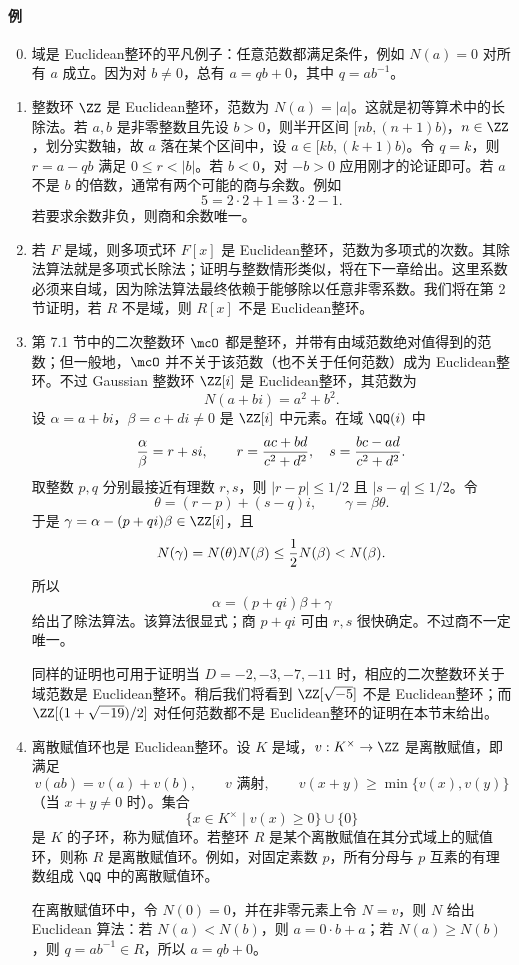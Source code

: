 \paragraph{例}
\begin{enumerate}[label=(\arabic*)]
	\setcounter{enumi}{-1}
	\item 域是 Euclidean整环的平凡例子：任意范数都满足条件，例如 $N(a)=0$ 对所有 $a$ 成立。因为对 $b\neq0$，总有 $a=qb+0$，其中 $q=ab^{-1}$。
	
	\item 整数环 $\ZZ$ 是 Euclidean整环，范数为 $N(a)=|a|$。这就是初等算术中的长除法。若 $a,b$ 是非零整数且先设 $b>0$，则半开区间 $[nb,(n+1)b)$，$n\in\ZZ$，划分实数轴，故 $a$ 落在某个区间中，设 $a\in[kb,(k+1)b)$。令 $q=k$，则 $r=a-qb$ 满足 $0\leq r<|b|$。若 $b<0$，对 $-b>0$ 应用刚才的论证即可。若 $a$ 不是 $b$ 的倍数，通常有两个可能的商与余数。例如
	\[
	5=2\cdot2+1=3\cdot2-1.
	\]
	若要求余数非负，则商和余数唯一。
	
	\item 若 $F$ 是域，则多项式环 $F[x]$ 是 Euclidean整环，范数为多项式的次数。其除法算法就是多项式长除法；证明与整数情形类似，将在下一章给出。这里系数必须来自域，因为除法算法最终依赖于能够除以任意非零系数。我们将在第 2 节证明，若 $R$ 不是域，则 $R[x]$ 不是 Euclidean整环。
	
	\item 第 7.1 节中的二次整数环 $\mcO$ 都是整环，并带有由域范数绝对值得到的范数；但一般地，$\mcO$ 并不关于该范数（也不关于任何范数）成为 Euclidean整环。不过 Gaussian 整数环 $\ZZ[i]$ 是 Euclidean整环，其范数为
	\[
	N(a+bi)=a^2+b^2.
	\]
	设 $\alpha=a+bi$，$\beta=c+di\neq0$ 是 $\ZZ[i]$ 中元素。在域 $\QQ(i)$ 中
	\[
	{\alpha\over\beta}=r+si,
	\qquad
	r={ac+bd\over c^2+d^2},\quad s={bc-ad\over c^2+d^2}.
	\]
	取整数 $p,q$ 分别最接近有理数 $r,s$，则 $|r-p|\leq1/2$ 且 $|s-q|\leq1/2$。令
	\[
	\theta=(r-p)+(s-q)i,
	\qquad \gamma=\beta\theta.
	\]
	于是 $\gamma=\alpha-(p+qi)\beta\in\ZZ[i]$，且
	\[
	N(\gamma)=N(\theta)N(\beta)\leq {1\over2}N(\beta)<N(\beta).
	\]
	所以
	\[
	\alpha=(p+qi)\beta+\gamma
	\]
	给出了除法算法。该算法很显式；商 $p+qi$ 可由 $r,s$ 很快确定。不过商不一定唯一。
	
	同样的证明也可用于证明当 $D=-2,-3,-7,-11$ 时，相应的二次整数环关于域范数是 Euclidean整环。稍后我们将看到 $\ZZ[\sqrt{-5}]$ 不是 Euclidean整环；而 $\ZZ[(1+\sqrt{-19})/2]$ 对任何范数都不是 Euclidean整环的证明在本节末给出。
	
	\item 离散赋值环也是 Euclidean整环。设 $K$ 是域，$v:K^\times\to\ZZ$ 是离散赋值，即满足
	\[
	v(ab)=v(a)+v(b),\qquad v \text{ 满射},\qquad
	v(x+y)\geq \min\{v(x),v(y)\}
	\]
	（当 $x+y\neq0$ 时）。集合
	\[
	\{x\in K^\times\mid v(x)\geq0\}\cup\{0\}
	\]
	是 $K$ 的子环，称为赋值环。若整环 $R$ 是某个离散赋值在其分式域上的赋值环，则称 $R$ 是离散赋值环。例如，对固定素数 $p$，所有分母与 $p$ 互素的有理数组成 $\QQ$ 中的离散赋值环。
	
	在离散赋值环中，令 $N(0)=0$，并在非零元素上令 $N=v$，则 $N$ 给出 Euclidean 算法：若 $N(a)<N(b)$，则 $a=0\cdot b+a$；若 $N(a)\geq N(b)$，则 $q=ab^{-1}\in R$，所以 $a=qb+0$。
\end{enumerate}

